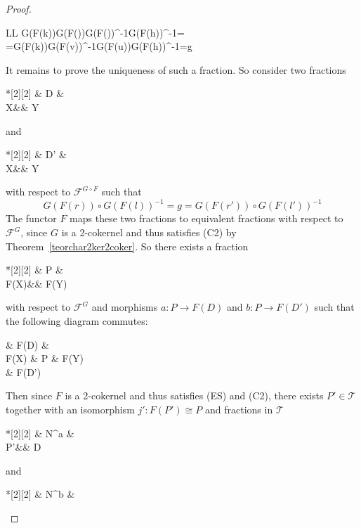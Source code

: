 \documentclass[11pt,reqno,a4paper]{amsart}
\newcommand{\linesep}[1]{\renewcommand{\arraystretch}{#1}}
\newlength\verspace
\newcommand{\vsep}[1][1.0]{\vspace*{#1\verspace}\xspace}
\theoremstyle{definition}
\theoremstyle{remark}
\def\nameit#1{\textrm{#1}~}
\def\thex{\nameit{Theorem}}
\newcommand{\T}{\mathcal{T}}
\newcommand{\F}{\mathcal{F}}
\newcommand{\0}{\mathbf{0}}
\renewcommand{\1}{\mathbf{1}}
\def\:{\colon}
\def\c{\circ}
\newcommand{\iso}{\cong}
\begin{document}
\begin{proof}
    \begin{center}
		\linesep{1.3}
		\begin{tabular}{LL}
			G(F(k))\c G(F())\c G(F())^{-1}\c G(F(h))^{-1}=\\
            =G(F(k))\c G(F(v))^{-1}\c G(F(u))\c G(F(h))^{-1}=g
		\end{tabular}\vsep[-1]
	\end{center}
    It remains to prove the uniqueness of such a fraction. So consider two fractions \begin{cd}*[2][2] \& D \& \\[-2ex]
	X\&\& Y
	\arrow["l"', from=1-2, to=2-1]
	\arrow["r", from=1-2, to=2-3]\end{cd} and \begin{cd}*[2][2] \& D' \& \\[-2ex]
	X\&\& Y
	\arrow["l'"', from=1-2, to=2-1]
	\arrow["r'", from=1-2, to=2-3]\end{cd} with respect to $\F^{G\c F}$ such that
    $$G(F(r))\c G(F(l))^{-1}=g=G(F(r'))\c G(F(l'))^{-1}$$
    The functor $F$ maps these two fractions to equivalent fractions with respect to $\F^G$, since $G$ is a 2-cokernel and thus satisfies (C2) by \thex\ref{teorchar2ker2coker}. So there exists a fraction \begin{cd}*[2][2] \& P \& \\[-2ex]
	F(X)\&\& F(Y)
	\arrow["\overline{l}"', from=1-2, to=2-1]
	\arrow["\overline{r}", from=1-2, to=2-3]\end{cd} with respect to $\F^G$ and morphisms $a\:P\to F(D)$ and $b\:P\to F(D')$ such that the following diagram commutes:
    \begin{cd}[4.5]
        \& {F(D)} \& \\
	{F(X)} \& P \& {F(Y)} \\
	\& {F(D')}
	\arrow["{F(l)}"', from=1-2, to=2-1]
	\arrow["{F(r)}", from=1-2, to=2-3]
	\arrow["a"', from=2-2, to=1-2]
	\arrow["{\overline{l}}", from=2-2, to=2-1]
	\arrow["{\overline{r}}"', from=2-2, to=2-3]
	\arrow["b", from=2-2, to=3-2]
	\arrow["{F(l')}", from=3-2, to=2-1]
	\arrow["{F(r')}"', from=3-2, to=2-3]
    \end{cd}
    Then since $F$ is a 2-cokernel and thus satisfies (ES) and (C2), there exists $P'\in \T$ together with an isomorphism $j'\:F(P')\iso P$ and fractions in $\T$
    \begin{cd}*[2][2] \& N^{a} \& \\[-2ex]
	P'\&\& D
	\arrow["s^a"', from=1-2, to=2-1]
	\arrow["t^a", from=1-2, to=2-3]\end{cd} and \begin{cd}*[2][2] \& N^{b} \& \\[-2ex]

\end{cd}
\end{proof}
\end{document}
